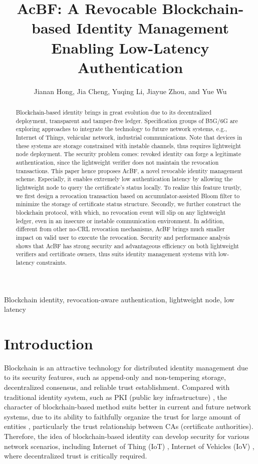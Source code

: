 \documentclass[conference]{IEEEtran}
\title{AcBF: A Revocable Blockchain-based Identity Management Enabling Low-Latency Authentication}
\author{Jianan Hong, Jia Cheng, Yuqing Li, Jiayue Zhou, and Yue Wu}
\begin{document}
\maketitle

\begin{abstract}
	Blockchain-based identity brings in great evolution due to its decentralized deployment, transparent and tamper-free ledger. Specification groups of B5G/6G are exploring approaches to integrate the technology to future network systems, e.g., Internet of Things, vehicular network, industrial communications. Note that devices in these systems are storage constrained with instable channels, thus requires lightweight node deployment. The security problem comes: revoked identity can forge a legitimate authentication, since the lightweight verifier does not maintain the revocation transactions. 
	This paper hence proposes AcBF, a novel revocable identity management scheme. Especially, it enables extremely low authentication latency by allowing the lightweight node to query the certificate's status locally. To realize this feature trustly, we first design a revocation transaction based on accumulator-assisted Bloom filter to minimize the storage of certificate status structure. Secondly, we further construct the blockchain protocol, with which, no revocation event will slip on any lightweight ledger, even in an insecure or instable communication environment.  
	In addition, different from other no-CRL revocation mechanisms, AcBF brings much smaller impact on valid user to execute the revocation. %
	Security and performance analysis
	shows that AcBF has strong security and advantageous efficiency on both lightweight verifiers and certificate owners, thus suits identity management systems with low-latency constraints.
\end{abstract}
\begin{IEEEkeywords}
    Blockchain identity, revocation-aware authentication, lightweight node, low latency
\end{IEEEkeywords}

\section{Introduction}
Blockchain is an attractive technology for distributed identity management \cite{9075663} due to its security features, such as append-only and non-tempering storage, decentralized consensus, and reliable trust establishment. Compared with traditional identity system, such as PKI (public key infrastructure) \cite{pki}, the character of blockchain-based method suits better in current and future network systems, due to its ability to faithfully organize the trust for large amount of entities \cite{chenCertchainPublicEfficient2018a,yang2018blockchain}, particularly the trust relationship between CAs (certificate authorities). 
Therefore, the idea of blockchain-based identity can develop security for various network scenarios, including Internet of Thing (IoT) \cite{zhangBPAFBlockchainEnabledReliable2022a, cui2022efficient}, Internet of Vehicles (IoV)  \cite{8010820,singh2018branch}, where decentralized trust is critically required. 
\end{document}
